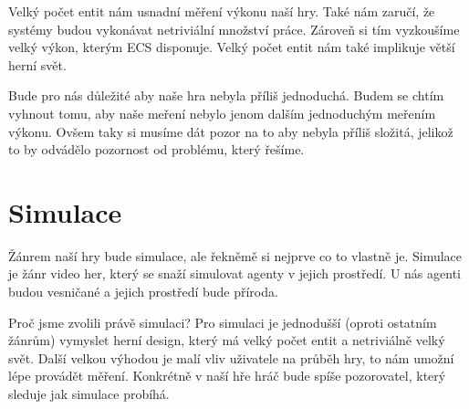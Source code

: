 Velký počet entit nám usnadní měření výkonu naší hry. Také nám zaručí, že systémy budou vykonávat netriviální množství práce. Zároveň si tím vyzkoušíme velký výkon, kterým ECS disponuje. Velký počet entit nám také implikuje větší herní svět.

Bude pro nás důležité aby naše hra nebyla příliš jednoduchá. Budem se chtím vyhnout tomu, aby naše meření nebylo jenom dalším jednoduchým meřením výkonu. Ovšem taky si musíme dát pozor na to aby nebyla příliš složitá, jelikož to by odvádělo pozornost od problému, který řešíme.


\section{Simulace}
Žánrem naší hry bude simulace, ale řekněmě si nejprve co to vlastně je. Simulace je žánr video her, který se snaží simulovat agenty v jejich prostředí. U nás agenti budou vesničané a jejich prostředí bude příroda.

Proč jsme zvolili právě simulaci? Pro simulaci je jednodušší (oproti ostatním žánrům) vymyslet herní design, který má velký počet entit a netriviálně velký svět. Další velkou výhodou je malí vliv uživatele na průběh hry, to nám umožní lépe provádět měření. Konkrétně v naší hře hráč bude spíše pozorovatel, který sleduje jak simulace probíhá.

